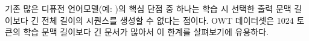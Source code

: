 \documentclass{article} %
\newcommand{\TODO}[1]{\textcolor{red}{[TODO: #1]}}
\def\algos{BD3-LMs}
\begin{document}


기존 많은 디퓨전 언어모델(예: \citet{austin2021structured,lou2024discrete})의 핵심 단점 중 하나는 학습 시 선택한 출력 문맥 길이보다 긴 전체 길이의 시퀀스를 생성할 수 없다는 점이다. OWT 데이터셋은 1024 토큰의 학습 문맥 길이보다 긴 문서가 많아서 이 한계를 살펴보기에 유용하다.

\end{document}
